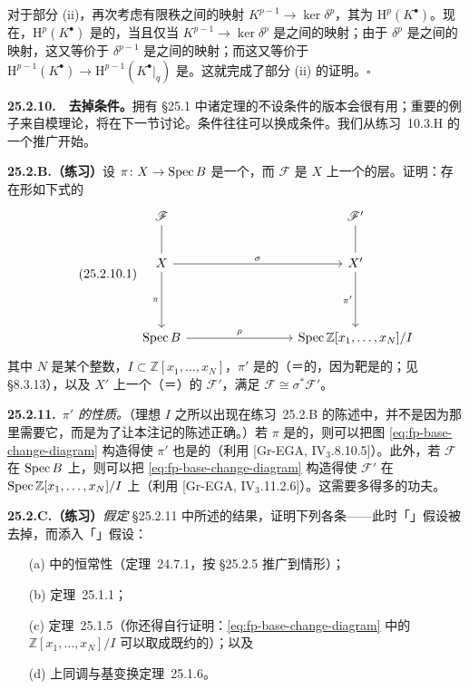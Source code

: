 对于部分 (ii)，再次考虑有限秩\trLocallyFreeSheaf{}之间的映射 $K^{p-1}\to\ker\delta^p$，其\trCokernel{}为 $\mathrm{H}^p(K^{\bullet})$。现在，$\mathrm{H}^p(K^{\bullet})$ 是\trLocallyFree{}的，当且仅当 $K^{p-1}\to\ker\delta^p$ 是\trVectorBundle{}之间的映射；由于 $\delta^p$ 是\trVectorBundle{}之间的映射，这又等价于 $\delta^{p-1}$ 是\trVectorBundle{}之间的映射；而这又等价于 $\mathrm{H}^{p-1}(K^{\bullet})\to\mathrm{H}^{p-1}(K^{\bullet}|_q)$ 是\trSurjectiveMap。这就完成了部分 (ii) 的证明。\hfill$\square$

\textbf{25.2.10.}\ \hard\ \textbf{去掉\trNoether{}条件。}\quad 拥有 \S25.1 中诸定理的不设\trNoether{}条件的版本会很有用；重要的例子来自模理论，将在下一节讨论。\trNoether{}条件往往可以换成\trFinitelyPresented{}条件。我们从\mbox{练习~10.3.H} 的一个推广开始。

\textbf{25.2.B.（练习）}\quad 设 $\pi\colon X\to\operatorname{Spec} B$ 是一个\trFinitelyPresented{}\trMorphism，而 $\mathscr{F}$ 是 $X$ 上一个\trFinitelyPresented{}的层。证明：存在形如下式的\trBaseChangeDiagram
\begin{equation*}
\tag{25.2.10.1}\label{eq:fp-base-change-diagram}
\begin{tikzcd}[row sep=2.2em, column sep=4.2em]
\mathscr{F} && \mathscr{F}' \\
X \ar[rr, "\sigma"] \ar[dd, "\pi"'] \ar[u, no head] && X' \ar[dd, "\pi'"'] \ar[u, no head] \\
\\
\Spec B \ar[rr, "\rho"] && \Spec \mathbb{Z}[x_1,\dots,x_N]/I
\end{tikzcd}
\end{equation*}
其中 $N$ 是某个整数，$I\subset\mathbb{Z}[x_1,\dots,x_N]$，$\pi'$ 是\trFinitelyPresented{}的（＝\trFiniteType{}的，因为靶是\trNoether{}的；见 \S8.3.13），以及 $X'$ 上一个\trFinitelyPresented{}（＝\trCoh）的\trQCSheaf{} $\mathscr{F}'$，满足 $\mathscr{F}\cong\sigma^*\mathscr{F}'$。

\textbf{25.2.11.}\ \emph{$\pi'$ 的性质。}\quad （理想 $I$ 之所以出现在\mbox{练习~25.2.B} 的陈述中，并不是因为那里需要它，而是为了让本注记的陈述正确。）若 $\pi$ 是\trProper{}的，则可以把图 \eqref{eq:fp-base-change-diagram} 构造得使 $\pi'$ 也是\trProper{}的（利用 [Gr-EGA, IV$_3$.8.10.5]）。此外，若 $\mathscr{F}$ 在 $\operatorname{Spec} B$ 上\trFlat，则可以把 \eqref{eq:fp-base-change-diagram} 构造得使 $\mathscr{F}'$ 在 $\operatorname{Spec}\mathbb{Z}[x_1,\dots,x_N]/I$ 上\trFlat（利用 [Gr-EGA, IV$_3$.11.2.6]）。这需要多得多的功夫。

\textbf{25.2.C.（练习）}\quad \emph{假定} \S25.2.11 中所述的结果，证明下列各条——此时「\trLocally\trNoether」假设被去掉，而添入「\trFinitelyPresented」假设：
\begin{itemize}
\item[(a)] \trFlat\trFamily{}中\trEulerCharacteristic{}的恒常性（\mbox{定理~24.7.1}，按 \S25.2.5 推广到\trProper{}情形）；
\item[(b)] \mbox{\trSemicontinuity{}定理~25.1.1}；
\item[(c)] \mbox{\trGrauert{}定理~25.1.5}（你还得自行证明：\eqref{eq:fp-base-change-diagram} 中的 $\mathbb{Z}[x_1,\dots,x_N]/I$ 可以取成既约的）；以及
\item[(d)] \mbox{上同调与基变换定理~25.1.6}。
\end{itemize}

